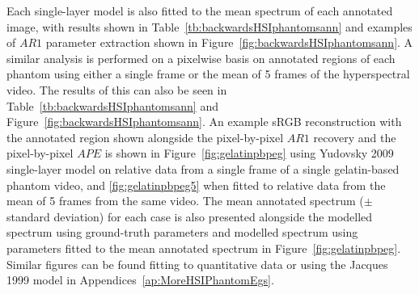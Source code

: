 Each single-layer model is also fitted to the mean spectrum of each annotated image, with results shown in Table~\ref{tb:backwardsHSIphantomsann} and examples of $AR1$ parameter extraction shown in Figure~\ref{fig:backwardsHSIphantomsann}. A similar analysis is performed on a pixelwise basis on annotated regions of each phantom using either a single frame or the mean of 5 frames of the hyperspectral video. The results of this can also be seen in Table~\ref{tb:backwardsHSIphantomsann} and Figure~\ref{fig:backwardsHSIphantomsann}.
An example sRGB reconstruction with the annotated region shown alongside the pixel-by-pixel $AR1$ recovery and the pixel-by-pixel $APE$ is shown in Figure~\ref{fig:gelatinpbpeg} using Yudovsky 2009 single-layer model on relative data from a single frame of a single gelatin-based phantom video, and \ref{fig:gelatinpbpeg5} when fitted to relative data from the mean of 5 frames from the same video. The mean annotated spectrum ($\pm$ standard deviation) for each case is also presented alongside the modelled spectrum using ground-truth parameters and modelled spectrum using parameters fitted to the mean annotated spectrum in Figure~\ref{fig:gelatinpbpeg}. Similar figures can be found fitting to quantitative data or using the Jacques 1999 model in Appendices~\ref{ap:MoreHSIPhantomEgs}.

